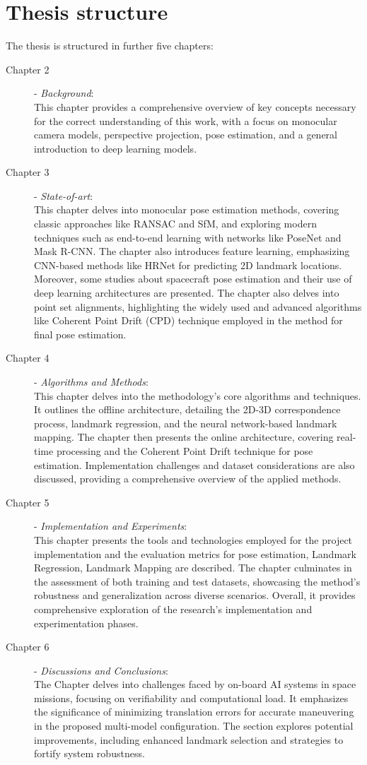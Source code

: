 \section{Thesis structure}
The thesis is structured in further five chapters:
\begin{description}
    \item[Chapter 2] - \textit{Background}:\\ This chapter provides a comprehensive overview of key concepts necessary for the correct understanding of this work, with a focus on monocular camera models, perspective projection, pose estimation, and a general introduction to deep learning models.
    \item[Chapter 3] - \textit{State-of-art}:\\ This chapter delves into monocular pose estimation methods, covering classic approaches like RANSAC and SfM, and exploring modern techniques such as end-to-end learning with networks like PoseNet and Mask R-CNN. The chapter also introduces feature learning, emphasizing CNN-based methods like HRNet for predicting 2D landmark locations. Moreover, some studies about spacecraft pose estimation and their use of deep learning architectures are presented. The chapter also delves into point set alignments, highlighting the widely used and advanced algorithms like Coherent Point Drift (CPD) technique employed in the method for final pose estimation.
    \item[Chapter 4] - \textit{Algorithms and Methods}: \\
    This chapter delves into the methodology's core algorithms and techniques. It outlines the offline architecture, detailing the 2D-3D correspondence process, landmark regression, and the neural network-based landmark mapping. The chapter then presents the online architecture, covering real-time processing and the Coherent Point Drift technique for pose estimation. Implementation challenges and dataset considerations are also discussed, providing a comprehensive overview of the applied methods.
    \item[Chapter 5] - \textit{Implementation and Experiments}:\\
    This chapter presents the tools and technologies employed for the project implementation and the evaluation metrics for pose estimation, Landmark Regression, Landmark Mapping are described. The chapter culminates in the assessment of both training and test datasets, showcasing the method's robustness and generalization across diverse scenarios. Overall, it provides comprehensive exploration of the research's implementation and experimentation phases.
    \item[Chapter 6] - \textit{Discussions and Conclusions}:\\
    The Chapter delves into challenges faced by on-board AI systems in space missions, focusing on verifiability and computational load. It emphasizes the significance of minimizing translation errors for accurate maneuvering in the proposed multi-model configuration. The section explores potential improvements, including enhanced landmark selection and strategies to fortify system robustness.
\end{description}